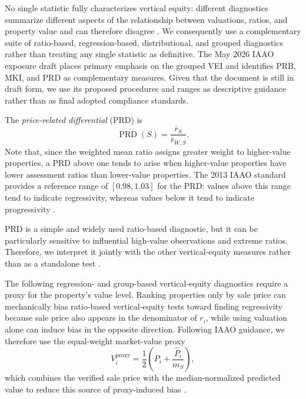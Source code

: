 \documentclass[10pt]{article}
\theoremstyle{definition}
\newcommand{\1}{\mathbf{1}}
\begin{document}
{No single statistic fully characterizes vertical equity: different diagnostics summarize different aspects of the relationship between valuations, ratios, and property value and can therefore disagree \cite{IAAO2023VerticalReview,IAAO2026ExposureRatio}. We consequently use a complementary suite of ratio-based, regression-based, distributional, and grouped diagnostics rather than treating any single statistic as definitive. The May 2026 IAAO exposure draft places primary emphasis on the grouped VEI and identifies PRB, MKI, and PRD as complementary measures. Given that the document is still in draft form, we use its proposed procedures and ranges as descriptive guidance rather than as final adopted compliance standards.}

The \emph{price-related differential} (PRD) is
\begin{equation}
\label{eq:prd}
\operatorname{PRD}(S)
=
\frac{\bar r_S}{\bar r_{W,S}}.
\end{equation}
Note that, since the weighted mean ratio assigns greater weight to higher-value properties, a PRD above one tends to arise when higher-value properties have lower assessment ratios than lower-value properties. The 2013 IAAO standard provides a reference range of $[0.98,1.03]$ for the PRD: values above this range tend to indicate regressivity, whereas values below it tend to indicate progressivity \cite{IAAO2013Ratio}.

{PRD is a simple and widely used ratio-based diagnostic, but it can be particularly sensitive to influential high-value observations and extreme ratios. Therefore, we interpret it jointly with the other vertical-equity measures rather than as a standalone test \cite{IAAO2026ExposureRatio}.}


{The following regression- and group-based vertical-equity diagnostics require a proxy for the property's value level. Ranking properties only by sale price can mechanically bias ratio-based vertical-equity tests toward finding regressivity because sale price also appears in the denominator of $r_i$, while using valuation alone can induce bias in the opposite direction. Following IAAO guidance, we therefore use the equal-weight market-value proxy}
\begin{equation}
\label{eq:market_value_proxy}
V_i^{\mathrm{proxy}}
=
\frac{1}{2}
\left(
P_i+\frac{\widehat P_i}{m_S}
\right),
\end{equation}
{which combines the verified sale price with the median-normalized predicted value to reduce this source of proxy-induced bias \cite{IAAO2013Ratio,IAAO2026ExposureRatio}.}
\end{document}
